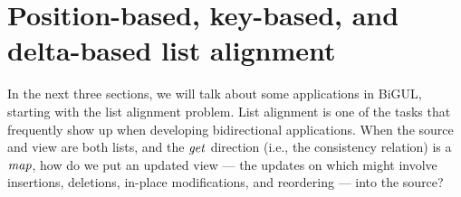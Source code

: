 













\section{Position-based, key-based, and delta-based list alignment}
\label{sec:alignment}


In the next three sections, we will talk about some applications in BiGUL, starting with the list alignment problem.
List alignment is one of the tasks that frequently show up when developing bidirectional applications.
When the source and view are both lists, and the \ensuremath{\Varid{get}} direction (i.e., the consistency relation) is a \ensuremath{\Varid{map}}, how do we put an updated view --- the updates on which might involve insertions, deletions, in-place modifications, and reordering --- into the source?

